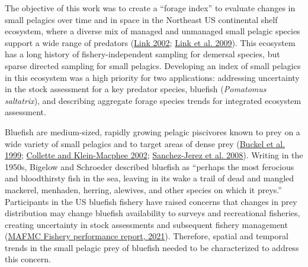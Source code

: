 \documentclass[
]{article}
\begin{document}
The objective of this work was to create a ``forage index'' to evaluate changes in small pelagics over time and in space in the Northeast US continental shelf ecosystem, where a diverse mix of managed and unmanaged small pelagic species support a wide range of predators (\protect\hyperlink{ref-link_does_2002}{Link 2002}; \protect\hyperlink{ref-link_response_2009}{Link et al. 2009}). This ecosystem has a long history of fishery-independent sampling for demersal species, but sparse directed sampling for small pelagics. Developing an index of small pelagics in this ecosystem was a high priority for two applications: addressing uncertainty in the stock assessment for a key predator species, bluefish (\emph{Pomatomus saltatrix}), and describing aggregate forage species trends for integrated ecosystem assessment.

Bluefish are medium-sized, rapidly growing pelagic piscivores known to prey on a wide variety of small pelagics and to target areas of dense prey (\protect\hyperlink{ref-buckel_foraging_1999}{Buckel et al. 1999}; \protect\hyperlink{ref-collette_bigelow_2002}{Collette and Klein-Macphee 2002}; \protect\hyperlink{ref-sanchez-jerez_interactions_2008}{Sanchez-Jerez et al. 2008}). Writing in the 1950s, Bigelow and Schroeder described bluefish as ``perhaps the most ferocious and bloodthirsty fish in the sea, leaving in its wake a trail of dead and mangled mackerel, menhaden, herring, alewives, and other species on which it preys.'' Participants in the US bluefish fishery have raised concerns that changes in prey distribution may change bluefish availability to surveys and recreational fisheries, creating uncertainty in stock assessments and subsequent fishery management (\href{https://www.mafmc.org/s/8_BF-FPR-2021.pdf}{MAFMC Fishery performance report, 2021}). Therefore, spatial and temporal trends in the small pelagic prey of bluefish needed to be characterized to address this concern.
\end{document}

